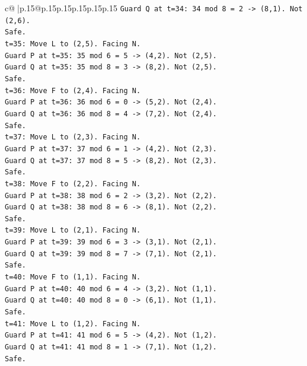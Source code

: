 \documentclass{article}
\begin{document}
{\begin{supertabular}{c@{$\;$}|p{.15\linewidth}@{}p{.15\linewidth}p{.15\linewidth}p{.15\linewidth}p{.15\linewidth}p{.15\linewidth}}
{{{\texttt{Guard Q at t=34: 34 mod 8 = 2 {-}> (8,1). Not (2,6).} \\
\texttt{Safe.} \\
\texttt{t=35: Move L to (2,5). Facing N.} \\
\texttt{Guard P at t=35: 35 mod 6 = 5 {-}> (4,2). Not (2,5).} \\
\texttt{Guard Q at t=35: 35 mod 8 = 3 {-}> (8,2). Not (2,5).} \\
\texttt{Safe.} \\
\texttt{t=36: Move F to (2,4). Facing N.} \\
\texttt{Guard P at t=36: 36 mod 6 = 0 {-}> (5,2). Not (2,4).} \\
\texttt{Guard Q at t=36: 36 mod 8 = 4 {-}> (7,2). Not (2,4).} \\
\texttt{Safe.} \\
\texttt{t=37: Move L to (2,3). Facing N.} \\
\texttt{Guard P at t=37: 37 mod 6 = 1 {-}> (4,2). Not (2,3).} \\
\texttt{Guard Q at t=37: 37 mod 8 = 5 {-}> (8,2). Not (2,3).} \\
\texttt{Safe.} \\
\texttt{t=38: Move F to (2,2). Facing N.} \\
\texttt{Guard P at t=38: 38 mod 6 = 2 {-}> (3,2). Not (2,2).} \\
\texttt{Guard Q at t=38: 38 mod 8 = 6 {-}> (8,1). Not (2,2).} \\
\texttt{Safe.} \\
\texttt{t=39: Move L to (2,1). Facing N.} \\
\texttt{Guard P at t=39: 39 mod 6 = 3 {-}> (3,1). Not (2,1).} \\
\texttt{Guard Q at t=39: 39 mod 8 = 7 {-}> (7,1). Not (2,1).} \\
\texttt{Safe.} \\
\texttt{t=40: Move F to (1,1). Facing N.} \\
\texttt{Guard P at t=40: 40 mod 6 = 4 {-}> (3,2). Not (1,1).} \\
\texttt{Guard Q at t=40: 40 mod 8 = 0 {-}> (6,1). Not (1,1).} \\
\texttt{Safe.} \\
\texttt{t=41: Move L to (1,2). Facing N.} \\
\texttt{Guard P at t=41: 41 mod 6 = 5 {-}> (4,2). Not (1,2).} \\
\texttt{Guard Q at t=41: 41 mod 8 = 1 {-}> (7,1). Not (1,2).} \\
\texttt{Safe.} \\
}}}
\end{supertabular}}
\end{document}
